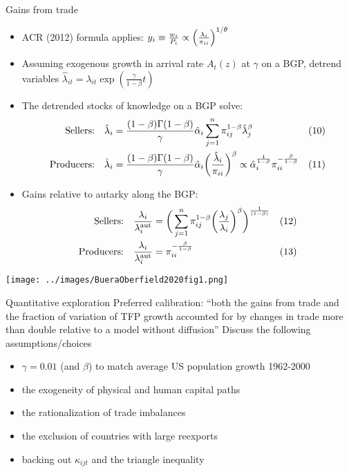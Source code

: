 \documentclass[10pt,notes=hide]{beamer}
\begin{document}
\begin{frame}{Gains from trade}
\begin{itemize}
\item ACR (2012) formula applies:
$%
y_i \equiv {w_i \over P_i} \propto \left( { \lambda_i \over \pi_{ii} } \right)^{1/\theta}
$%
\item Assuming exogenous growth in arrival rate $A_t(z)$ at $\gamma$ on a BGP,
detrend variables $\hat{\lambda}_{it} = \lambda_{it} \exp\left(\frac{\gamma}{1-\beta}t\right)$
\item The detrended stocks of knowledge on a BGP solve:
\begin{align*}
\text{Sellers:}
&\quad \hat \lambda_i = { (1-\beta)\Gamma(1-\beta)  \over \gamma } \hat \alpha_i \sum_{j=1}^n \pi_{ij}^{1-\beta} \hat \lambda_j^\beta 
&\text{(10)}\\
\text{Producers:}
&\quad \hat \lambda_i = { (1-\beta)\Gamma(1-\beta)  \over \gamma } \hat \alpha_i \bigg( {\hat \lambda_i \over \pi_{ii} } \bigg)^\beta \propto \hat \alpha_i^{1 \over 1 - \beta} \pi_{ii}^{ - {\beta \over 1 - \beta}} 
&\text{(11)}
\end{align*}
\item Gains relative to autarky along the BGP:
\begin{align*}
\text{Sellers:}
&\quad { \lambda_i \over \lambda_i^{\text{aut}} } = \bigg( \sum_{j=1}^n \pi_{ij}^{1-\beta} \bigg( { \lambda_j \over \lambda_i } \bigg)^\beta \bigg)^{1 \over (1-\beta) }
&\text{(12)}\\
\text{Producers:}
&\quad { \lambda_i \over \lambda_i^{\text{aut}} } = \pi_{ii}^{- {\beta \over 1 - \beta}}
&\text{(13)}
\end{align*}
\end{itemize}
\end{frame}
\begin{frame}{}
\texttt{[image: ../images/BueraOberfield2020fig1.png]}
\end{frame}
\begin{frame}{Quantitative exploration}
Preferred calibration:
``both the gains from trade and the fraction of variation of TFP growth accounted for by changes in trade more than double relative to a model without diffusion''
\vspace{5mm}
Discuss the following assumptions/choices
\begin{itemize}
\item $\gamma = 0.01$ (and $\beta$) to match average US population growth 1962-2000
\item the exogeneity of physical and human capital paths
\item the rationalization of trade imbalances
\item the exclusion of countries with large reexports
\item backing out $\kappa_{ijt}$ and the triangle inequality
\end{itemize}
\end{frame}
\end{document}
